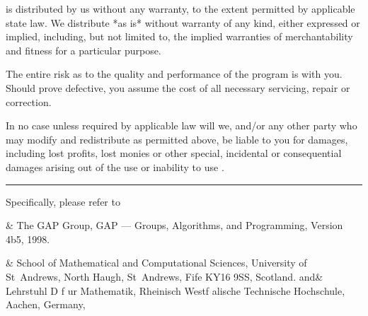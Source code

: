 {\GAP} is distributed by us without any warranty, to the extent permitted
by applicable state law.  We  distribute {\GAP} *as is* without  warranty
of any kind, either expressed or implied, including,  but not limited to,
the implied  warranties  of merchantability and  fitness for a particular
purpose.

The entire risk as to the quality and performance of the program is  with
you.  Should {\GAP} prove defective, you assume the cost of all necessary
servicing, repair or correction.

In no  case  unless  required by applicable law will we, and/or any other
party who  may  modify  and  redistribute  {\GAP}  as permitted above, be
liable  to you for damages, including lost profits, lost monies or  other
special, incidental or consequential damages  arising out  of the  use or
inability to use {\GAP}.

\hrule

Specifically, please refer to

\beginitems
[GAP 98]&
        The GAP Group, GAP --- Groups, Algorithms, and Programming,
        Version 4b5, 1998.

&
School of Mathematical and Computational Sciences,
University of St~Andrews,
North Haugh, St~Andrews, Fife KY16 9SS, Scotland.
and&
Lehrstuhl D f{ u}r Mathematik,
Rheinisch Westf{ a}lische Technische Hochschule, Aachen,
Germany,
\enditems

